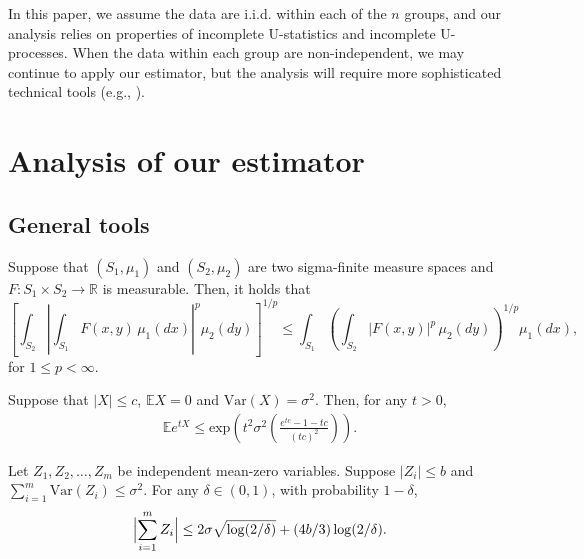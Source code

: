 \documentclass[preprint,11pt]{article}
\newcommand{\mbb}{\mathbb}
\newcommand{\Var}{\text{Var}}
\numberwithin{equation}{section}
\begin{document}
In this paper, we assume the data are i.i.d. within each of the $n$ groups, and our analysis relies on properties of incomplete U-statistics and incomplete U-processes. When the data within each group are non-independent, we may continue to apply our estimator, but the analysis will require more sophisticated technical tools (e.g., \cite{wu2008empirical}). 






\appendix


\section{Analysis of our estimator} \label{supp:UBproofs}






\subsection{General tools}
\begin{lemma}\label{lem:Minkowski}
    Suppose that $(S_1,\mu_1)$ and $(S_2,\mu_2)$ are two sigma-finite measure spaces and $F:S_1\times S_2\rightarrow \mbb{R}$ is measurable. Then, it holds that
    \[
        \left[ \int_{S_2} \left| \int_{S_1} F(x, y) \, \mu_1(dx) \right|^p \mu_2(dy) \right]^{1/p}\le\int_{S_1} \left( \int_{S_2} |F(x, y)|^p \, \mu_2(dy) \right)^{1/p} \mu_1(dx),
    \]
    for $1\le p<\infty$.
\end{lemma}


\begin{lemma}\label{lem:mgfbound}
    Suppose that $|X|\le c$, $\mbb{E}X=0$ and $\Var(X)=\sigma^2$. Then, for any $t>0$,
    \begin{align*}
        \mbb{E}e^{tX}\le \text{exp}\left(t^2\sigma^2\left(\frac{e^{tc}-1-tc}{(tc)^2}\right)\right).
    \end{align*}
\end{lemma}

\begin{lemma} \label{lem:Bernstein}
Let $Z_1, Z_2, \ldots, Z_m$ be independent mean-zero variables. Suppose $|Z_i|\leq b$ and $\sum_{i=1}^m\mathrm{Var}(Z_i)\leq \sigma^2$. For any $\delta\in (0,1)$, with probability $1-\delta$, 
\begin{align*}
\Bigl|\sum_{i=1}^m Z_i\Bigr|\leq 2\sigma\sqrt{\log(2/\delta)} + (4b/3)\log(2/\delta). 
\end{align*}
\end{lemma}
\end{document}
